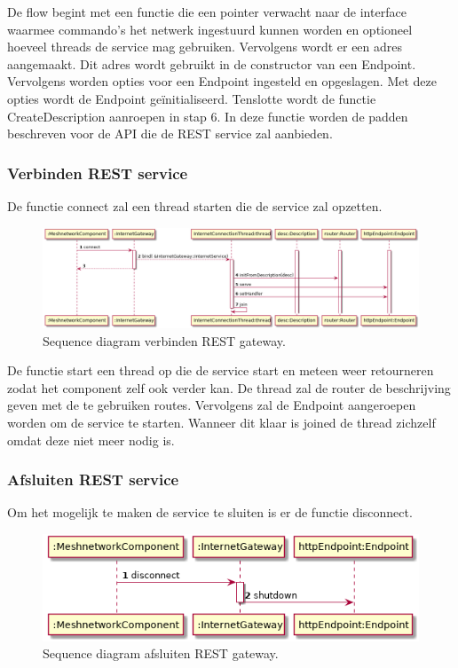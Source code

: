 \documentclass[a4paper, 11pt, oneside]{report}
\begin{document}
De flow begint met een functie die een pointer verwacht naar de interface waarmee commando's het netwerk ingestuurd kunnen worden en optioneel hoeveel threads de service mag gebruiken.
Vervolgens wordt er een adres aangemaakt.
Dit adres wordt gebruikt in de constructor van een Endpoint.
Vervolgens worden opties voor een Endpoint ingesteld en opgeslagen.
Met deze opties wordt de Endpoint geïnitialiseerd.
Tenslotte wordt de functie CreateDescription aanroepen in stap 6.
In deze functie worden de padden beschreven voor de API die de REST service zal aanbieden.

\subsubsection{Verbinden REST service}
De functie connect zal een thread starten die de service zal opzetten.


\begin{figure}[H]
	\begin{center}\includegraphics[width=1\linewidth]{UML/out/REST/sequence/connect/connect.png}\end{center}
	\caption{Sequence diagram verbinden REST gateway.}
	\label{fig:component:RESTgateway:connect}
\end{figure}

De functie start een thread op die de service start en meteen weer retourneren zodat het component zelf ook verder kan.
De thread zal de router de beschrijving geven met de te gebruiken routes.
Vervolgens zal de Endpoint aangeroepen worden om de service te starten.
Wanneer dit klaar is joined de thread zichzelf omdat deze niet meer nodig is.

\subsubsection{Afsluiten REST service}
Om het mogelijk te maken de service te sluiten is er de functie disconnect.

\begin{figure}[H]
	\begin{center}\includegraphics[width=.6\linewidth]{UML/out/REST/sequence/disconnect/disconnect.png}\end{center}
	\caption{Sequence diagram afsluiten REST gateway.}
	\label{fig:component:RESTgateway:disconnect}
\end{figure}
\end{document}
